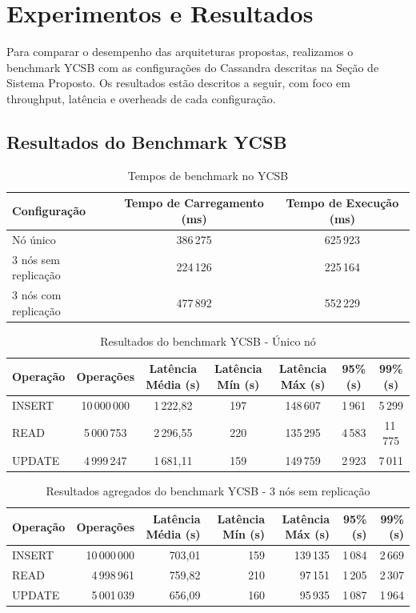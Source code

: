 \section{Experimentos e Resultados}

Para comparar o desempenho das arquiteturas propostas, realizamos o benchmark YCSB com as configurações do Cassandra descritas na Seção de Sistema Proposto.
Os resultados estão descritos a seguir, com foco em throughput, latência e overheads de cada configuração.

\subsection{Resultados do Benchmark YCSB}
\begin{table}[H]
\centering
\caption{Tempos de benchmark no YCSB}
\begin{tabular}{lcc}
\hline
Configuração & Tempo de Carregamento (ms) & Tempo de Execução (ms) \\
\hline
Nó único & 386\,275 & 625\,923 \\
3 nós sem replicação  & 224\,126 & 225\,164 \\
3 nós com replicação  & 477\,892 & 552\,229 \\
\hline
\end{tabular}
\end{table}

\begin{table}[H]
    \centering
	\small
    \caption{Resultados do benchmark YCSB - Único nó}
    \begin{tabular}{lcccccc}
    \hline
	Operação & Operações & Latência Média (\textmu s) & Latência Mín (\textmu s) & Latência Máx (\textmu s) & 95\% (\textmu s) & 99\% (\textmu s) \\
	\hline
	INSERT   & 10\,000\,000 & 1\,222,82 & 197   & 148\,607 & 1\,961 & 5\,299 \\
	READ     & 5\,000\,753  & 2\,296,55 & 220   & 135\,295 & 4\,583 & 11\,775 \\
	UPDATE   & 4\,999\,247  & 1\,681,11 & 159   & 149\,759 & 2\,923 & 7\,011 \\
	\hline
    \end{tabular}
    \end{table}

    \begin{table}[H]
    \centering
	\small
    \caption{Resultados agregados do benchmark YCSB - 3 nós sem replicação}
    \begin{tabular}{lrrrrrr}
    \hline
	Operação & Operações & Latência Média (\textmu s) & Latência Mín (\textmu s) & Latência Máx (\textmu s) & 95\% (\textmu s) & 99\% (\textmu s) \\
	\hline
	INSERT   & 10\,000\,000 & 703,01 & 159 & 139\,135 & 1\,084 & 2\,669 \\
	READ     & 4\,998\,961  & 759,82 & 210 & 97\,151  & 1\,205 & 2\,307 \\
	UPDATE   & 5\,001\,039  & 656,09 & 160 & 95\,935  & 1\,087 & 1\,964 \\
	\hline
    \end{tabular}
    \end{table}

